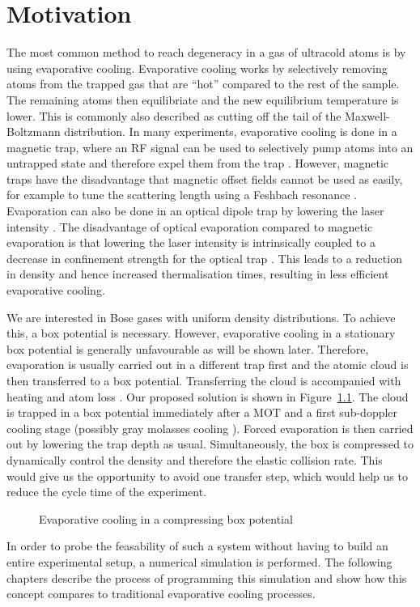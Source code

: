
\chapter{Motivation}
\label{cha:eva_motivation}
The most common method to reach degeneracy in a gas of ultracold atoms is by using evaporative cooling. Evaporative cooling works by selectively removing atoms from the trapped gas that are \enquote{hot} compared to the rest of the sample. The remaining atoms then equilibriate and the new equilibrium temperature is lower. This is commonly also described as cutting off the tail of the Maxwell-Boltzmann distribution. In many experiments, evaporative cooling is done in a magnetic trap, where an RF signal can be used to selectively pump atoms into an untrapped state and therefore expel them from the trap \cite{PhysRevLett.74.3352}. However, magnetic traps have the disadvantage that magnetic offset fields cannot be used as easily, for example to tune the scattering length using a Feshbach resonance \cite{PhysRevA.71.011602}. Evaporation can also be done in an optical dipole trap by lowering the laser intensity \cite{Chaudhuri_2007}. The disadvantage of optical evaporation compared to magnetic evaporation is that lowering the laser intensity is intrinsically coupled to a decrease in confinement strength for the optical trap \cite{PhysRevA.79.061406}. This leads to a reduction in density and hence increased thermalisation times, resulting in less efficient evaporative cooling.

We are interested in Bose gases with uniform density distributions. To achieve this, a box potential is necessary. However, evaporative cooling in a stationary box potential is generally unfavourable as will be shown later. Therefore, evaporation is usually carried out in a different trap first and the atomic cloud is then transferred to a box potential. Transferring the cloud is accompanied with heating and atom loss \cite{PhysRevLett.110.200406}. Our proposed solution is shown in Figure~\ref{fig:evap_box_sketch}. The cloud is trapped in a box potential immediately after a MOT and a first sub-doppler cooling stage (possibly gray molasses cooling \cite{Rosi2018enhancedGM}). Forced evaporation is then carried out by lowering the trap depth as usual. Simultaneously, the box is compressed to dynamically control the density and therefore the elastic collision rate. This would give us the opportunity to avoid one transfer step, which would help us to reduce the cycle time of the experiment. 
\begin{figure}[htbp]
    \centering
    
    \caption{Evaporative cooling in a compressing box potential}
    \label{fig:evap_box_sketch}
\end{figure}
%
In order to probe the feasability of such a system without having to build an entire experimental setup, a numerical simulation is performed. The following chapters describe the process of programming this simulation and show how this concept compares to traditional evaporative cooling processes.